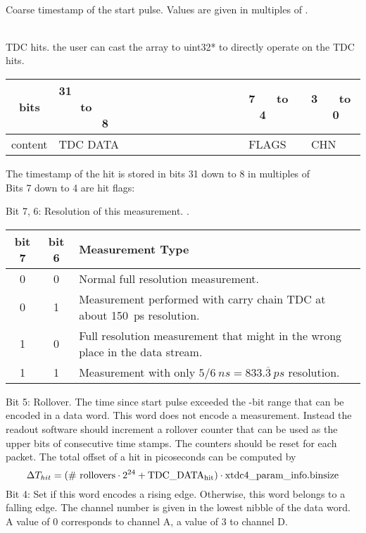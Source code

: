 	\\
	Coarse timestamp of the start pulse. Values are given in multiples of .\par

	\\
	TDC hits. the user can cast the array to uint32* to directly operate on the TDC hits.

	\noindent
	\begin{small}
	\begin{tabular}{|c||p{9cm}|p{}|p{}|}
		\hline
		bits & 31~ ~ ~ ~ ~ ~ ~ ~ ~ ~ ~ ~ ~ ~ ~ ~ ~ to ~ ~ ~ ~ ~ ~ ~ ~ ~ ~ ~ ~ ~ ~ ~ ~ ~ 8 & 7~ ~ to ~ ~ 4 & 3~ ~ to ~ ~ 0\\\hline
		content & TDC DATA & FLAGS & CHN \\\hline
	\end{tabular}
	\end{small}

	The timestamp of the hit is stored in bits 31 down to 8 in multiples of 
	\\
	
	\label{flags}
	Bits 7 down to 4 are hit flags:\par
	 {
		Bit 7, 6: Resolution of this measurement. \ifxHPTDC{}{See section \ref{difficulthits}}.\\
		\noindent
		\begin{small}
		\begin{tabular}{|c|c||l|}
			\hline
			bit 7 & bit 6 & Measurement Type \\\hline\hline
			0 & 0 &  Normal full resolution measurement.\\\hline
			0 & 1 &  Measurement performed with carry chain TDC at about 150~ps resolution.\\\hline
			1 & 0 &  Full resolution measurement that might in the wrong place in the data stream.\\\hline
			1 & 1 &  Measurement with only $5/6~ns = 833.\overline{3}~ps$ resolution. \\\hline
		\end{tabular}
		\end{small}
		
	}
	Bit 5: Rollover. The time since start pulse exceeded the -bit range that can be encoded in a data word. This word does not encode a measurement. 
	Instead the readout software should increment a rollover counter that can be used as the upper bits of consecutive time stamps.  
	The counters should be reset for each packet.
	The total offset of a hit in picoseconds can be computed by
	\[	\Delta T_{hit} = \mathrm{(\#\ rollovers \cdot 2^{\itett{23}{24}} + TDC\_ DATA_{hit}) \cdot \itett{timetagger4}{xtdc4}\_param\_info.binsize} \]
	\indent
	Bit 4: Set if this word encodes a rising edge. Otherwise, this word belongs to a falling edge.
	The channel number is given in the lowest nibble of the data word. A value of 0 corresponds to channel A, a value of 3 to channel D.\par
 